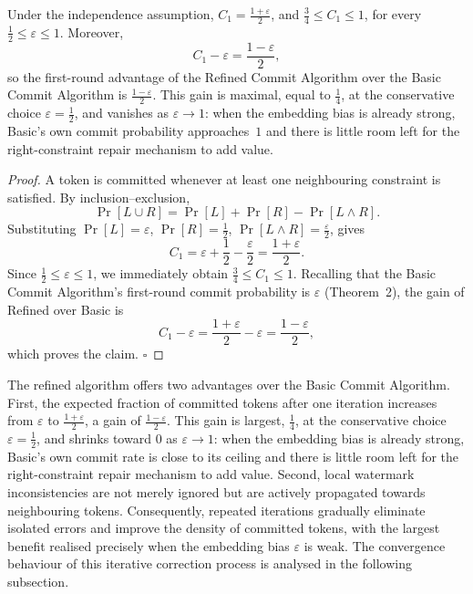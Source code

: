 \documentclass[a4paper,11pt]{llncs}
\begin{document}
\begin{theorem}
Under the independence assumption, $C_1=\frac{1+\varepsilon}{2}$, and
$\frac34\le C_1\le1$, for every $\frac12\le\varepsilon\le1$. Moreover,
\[
C_1-\varepsilon=\frac{1-\varepsilon}{2},
\]
so the first-round advantage of the Refined Commit Algorithm over the Basic Commit
Algorithm is $\frac{1-\varepsilon}{2}$. This gain is maximal, equal to $\frac14$, at the
conservative choice $\varepsilon=\frac12$, and vanishes as $\varepsilon\to1$: when the
embedding bias is already strong, Basic's own commit probability approaches~$1$ and there is
little room left for the right-constraint repair mechanism to add value.
\end{theorem}

\begin{proof}
A token is committed whenever at least one neighbouring constraint is satisfied. By
inclusion--exclusion,
\[
\Pr[L\cup R] = \Pr[L]+\Pr[R]-\Pr[L\land R].
\]
Substituting $\Pr[L]=\varepsilon$, $\Pr[R]=\frac12$, $\Pr[L\land R]=\frac{\varepsilon}{2}$,
gives
\[
C_1 = \varepsilon+\frac12-\frac{\varepsilon}{2} = \frac{1+\varepsilon}{2}.
\]
Since $\frac12\le\varepsilon\le1$, we immediately obtain $\frac34\le C_1\le1$. Recalling that
the Basic Commit Algorithm's first-round commit probability is $\varepsilon$ (Theorem~2), the
gain of Refined over Basic is
\[
C_1-\varepsilon = \frac{1+\varepsilon}{2}-\varepsilon = \frac{1-\varepsilon}{2},
\]
which proves the claim.
\hfill$\square$
\end{proof}

The refined algorithm offers two advantages over the Basic Commit Algorithm. First, the
expected fraction of committed tokens after one iteration increases from $\varepsilon$ to
$\frac{1+\varepsilon}{2}$, a gain of $\frac{1-\varepsilon}{2}$. This gain is largest,
$\frac14$, at the conservative choice $\varepsilon=\frac12$, and shrinks toward $0$ as
$\varepsilon\to1$: when the embedding bias is already strong, Basic's own commit rate is
close to its ceiling and there is little room left for the right-constraint repair
mechanism to add value. Second, local watermark inconsistencies are not merely ignored but
are actively propagated towards neighbouring tokens. Consequently, repeated iterations
gradually eliminate isolated errors and improve the density of committed tokens, with the
largest benefit realised precisely when the embedding bias $\varepsilon$ is weak. The
convergence behaviour of this iterative correction process is analysed in the following
subsection.
\end{document}
